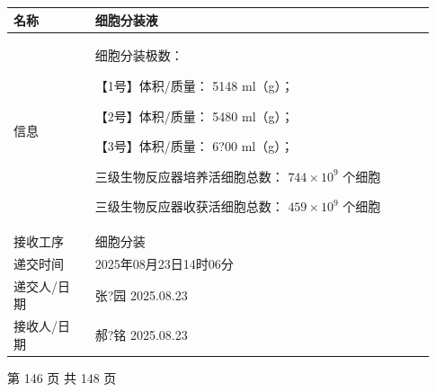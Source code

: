 \documentclass[UTF8,10pt,a4paper,fontset=fandol]{ctexart}
\newcommand{\fieldvalue}[1]{#1}
\newcommand{\handwritten}[1]{#1}
\begin{document}
\begin{tabular}{|p{0.18\linewidth}|p{0.75\linewidth}|}
\hline
名称 & 细胞分装液 \\ \hline
信息 &
细胞分装极数：\par
【1号】体积/质量：
\fieldvalue{\handwritten{5148}} ml（g）；\par
【2号】体积/质量：
\fieldvalue{\handwritten{5480}} ml（g）；\par
【3号】体积/质量：
\fieldvalue{\handwritten{6?00}} ml（g）；\par
三级生物反应器培养活细胞总数：
\fieldvalue{\handwritten{$744\times 10^{9}$}} 个细胞\par
三级生物反应器收获活细胞总数：
\fieldvalue{\handwritten{$459\times 10^{9}$}} 个细胞
\\ \hline
接收工序 & 细胞分装 \\ \hline
递交时间 &
\fieldvalue{\handwritten{2025年08月23日14时06分}}
\\ \hline
递交人/日期 &
\fieldvalue{\handwritten{张?园}}\quad
\fieldvalue{\handwritten{2025.08.23}}
\\ \hline
接收人/日期 &
\fieldvalue{\handwritten{郝?铭}}\quad
\fieldvalue{\handwritten{2025.08.23}}
\\ \hline
\end{tabular}

\vfill

\begin{center}
第 146 页 共 148 页
\end{center}
\end{document}
